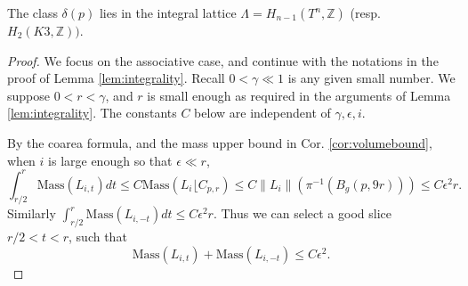 \documentclass[10pt,a4paper]{amsart}
\newcommand{\Z}{\mathbb{Z}}
\newcommand{\norm}[1]{\left\lVert#1\right\rVert}
\begin{document}
		\begin{lem}\label{lem:integrality}
		The class $\delta(p)$ lies in the integral lattice $\Lambda= H_{n-1}(T^n,\Z)$ (resp. $H_2(K3,\Z))$.
		\end{lem}

		\begin{proof}
			We focus on the associative case, and continue with the notations in the proof of Lemma \ref{lem:integrality}. Recall $0< \gamma\ll 1$ is any given small number.  We suppose $0<r<\gamma$, and $r$ is small enough as required in the arguments of Lemma \ref{lem:integrality}. The constants $C$ below are independent of $\gamma, \epsilon, i$. 
			
			
			
		
			
			
			
			
			
			
		
			
	By the coarea formula, and the mass upper bound in Cor. \ref{cor:volumebound}, when $i$ is large enough so that $\epsilon\ll r$,
			\[
			\int_{r/2}^r  \text{Mass}   (  {L_{i,t}} )  dt \leq C \text{Mass}(   L_i \lfloor  C_{p,r}     ) \leq C \norm{L_i}( \pi^{-1}(B_g(p, 9r))   )\leq C\epsilon^2 r. 
			\]
			Similarly
		$
				\int_{r/2}^r  \text{Mass}   (  {L_{i,-t}} )  dt \leq C\epsilon^2 r. 
$
			Thus we can select a  good slice $r/2<t<r$, such that 
			\begin{equation}
			\text{Mass}   (  {L_{i,t}} ) + 	\text{Mass}   (  {L_{i,-t}} ) \leq C\epsilon^2.
			\end{equation}
			
			
			

\end{proof}
\end{document}
